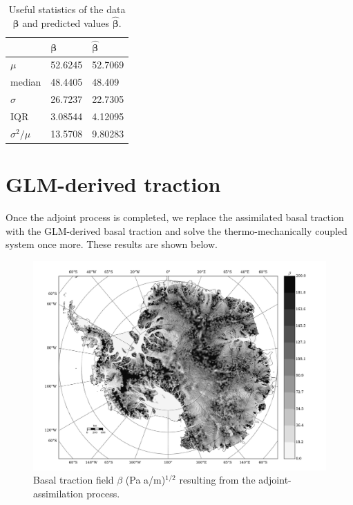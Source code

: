 \begin{table}[H]
\centering
\normalsize
\begin{tabular}{l|l|l}
  & $\bm{\beta}$ & $\bm{\hat{\beta}}$ \\
  \hline
$\mu$ & 52.6245 & 52.7069 \\
median & 48.4405 & 48.409 \\
$\sigma$ & 26.7237 & 22.7305 \\
IQR & 3.08544 & 4.12095 \\
$\sigma^2 / \mu$ & 13.5708 & 9.80283 \\
\end{tabular}
  \caption[]{\normalsize Useful statistics of the data $\bm{\beta}$ and predicted values $\bm{\hat{\beta}}$.}
\end{table}

\section{GLM-derived traction}

Once the adjoint process is completed, we replace the assimilated basal traction with the GLM-derived basal traction and solve the thermo-mechanically coupled system once more.  These results are shown below.

\begin{figure}
  \centering
  \begin{minipage}[b]{1.00\linewidth}
    \includegraphics[width=1.0\textwidth]{images/antarctica/model/beta.jpg}
  \end{minipage}
	\caption[]{Basal traction field $\beta$ (Pa a/m)$^{1/2}$ resulting from the adjoint-assimilation process.}
\end{figure}


